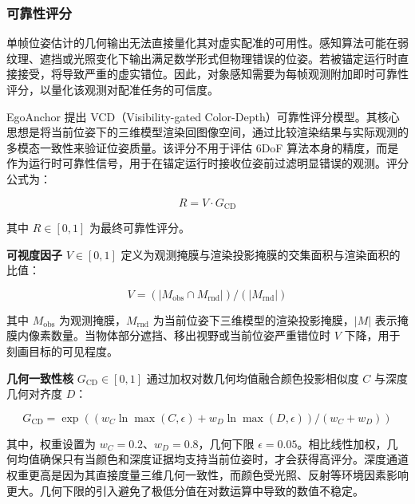 \documentclass[9pt,twocolumn,letterpaper]{extarticle}
\begin{document}
\subsubsection{可靠性评分}\label{sec:reliability}


单帧位姿估计的几何输出无法直接量化其对虚实配准的可用性。感知算法可能在弱纹理、遮挡或光照变化下输出满足数学形式但物理错误的位姿。若被锚定运行时直接接受，将导致严重的虚实错位。因此，对象感知需要为每帧观测附加即时可靠性评分，以量化该观测对配准任务的可信度。

EgoAnchor 提出 VCD（Visibility-gated Color-Depth）可靠性评分模型。其核心思想是将当前位姿下的三维模型渲染回图像空间，通过比较渲染结果与实际观测的多模态一致性来验证位姿质量。该评分不用于评估 6DoF 算法本身的精度，而是作为运行时可靠性信号，用于在锚定运行时接收位姿前过滤明显错误的观测。评分公式为：

\begin{equation}
R = V \cdot G_{\mathrm{CD}}
\label{eq:reliability}
\end{equation}


其中 $R \in [0,1]$ 为最终可靠性评分。

\textbf{可视度因子} $V \in [0,1]$ 定义为观测掩膜与渲染投影掩膜的交集面积与渲染面积的比值：

\begin{equation}
V = (\lvert M_{\mathrm{obs}} \cap M_{\mathrm{rnd}} \rvert) / (\lvert M_{\mathrm{rnd}} \rvert)
\label{eq:visibility}
\end{equation}


其中 $M_{\mathrm{obs}}$ 为观测掩膜，$M_{\mathrm{rnd}}$ 为当前位姿下三维模型的渲染投影掩膜，$\lvert M \rvert$ 表示掩膜内像素数量。当物体部分遮挡、移出视野或当前位姿严重错位时 $V$ 下降，用于刻画目标的可见程度。

\textbf{几何一致性核} $G_{\mathrm{CD}} \in [0,1]$ 通过加权对数几何均值融合颜色投影相似度 $C$ 与深度几何对齐度 $D$：

\begin{equation}
G_{\mathrm{CD}} = \exp\!\left((w_C \ln \max\!\left(C, \epsilon\right) + w_D \ln \max\!\left(D, \epsilon\right)) / (w_C + w_D)\right)
\label{eq:cd-consistency}
\end{equation}


其中，权重设置为 $w_C = 0.2$、$w_D = 0.8$，几何下限 $\epsilon = 0.05$。相比线性加权，几何均值确保只有当颜色和深度证据均支持当前位姿时，才会获得高评分。深度通道权重更高是因为其直接度量三维几何一致性，而颜色受光照、反射等环境因素影响更大。几何下限的引入避免了极低分值在对数运算中导致的数值不稳定。
\end{document}
